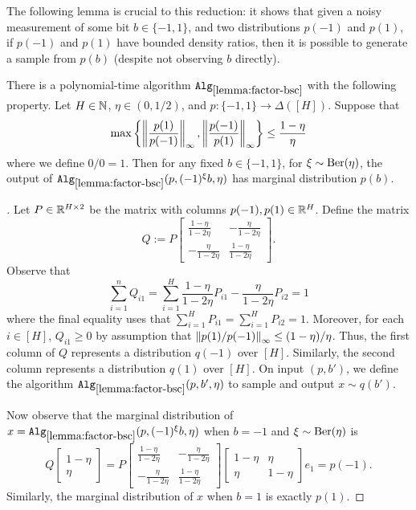 The following lemma is crucial to this reduction: it shows that given a noisy measurement of some bit $b \in \{-1,1\}$, and two distributions $p(-1)$ and $p(1)$, if $p(-1)$ and $p(1)$ have bounded density ratios, then it is possible to generate a sample from $p(b)$ (despite not observing $b$ directly).

\begin{lemma}\label{lemma:factor-bsc}
There is a polynomial-time algorithm $\texttt{Alg}_{\ref{lemma:factor-bsc}}$ with the following property. Let $H \in \mathbb{N}$, $\eta \in (0,1/2)$, and $p: \{-1,1\} \to \Delta([H])$. Suppose that \[\max\left\{\left \lVert \frac{p(1)}{p(-1)} \right \rVert_\infty, \left \lVert \frac{p(-1)}{p(1)} \right \rVert_\infty\right\} \leq \frac{1-\eta}{\eta}\]
where we define $0/0 = 1$. Then for any fixed $b \in \{-1,1\}$, for $\xi \sim \mathrm{Ber}(\eta)$, the output of $\texttt{Alg}_{\ref{lemma:factor-bsc}}(p,(-1)^\xi b,\eta)$ has marginal distribution $p(b)$. %
\end{lemma}

\begin{proof}[]
Let $P \in \mathbb{R}^{H \times 2}$ be the matrix with columns $p(-1), p(1) \in \mathbb{R}^H$. Define the matrix
\[Q := P \begin{bmatrix} \frac{1-\eta}{1-2\eta} & -\frac{\eta}{1-2\eta} \\ -\frac{\eta}{1-2\eta} & \frac{1-\eta}{1-2\eta} \end{bmatrix}.\]
Observe that \[\sum_{i=1}^n Q_{i1} = \sum_{i=1}^H \frac{1-\eta}{1-2\eta} P_{i1} - \frac{\eta}{1-2\eta} P_{i2} = 1\] where the final equality uses that $\sum_{i=1}^H P_{i1} = \sum_{i=1}^H P_{i2} = 1$. Moreover, for each $i \in [H]$,
$Q_{i1} \geq 0$ by assumption that $\left \lVert p(1)/p(-1) \right \rVert_\infty \leq (1-\eta)/\eta$. Thus, the first column of $Q$ represents a distribution $q(-1)$ over $[H]$. Similarly, the second column represents a distribution $q(1)$ over $[H]$. On input $(p,b')$, we define the algorithm $\texttt{Alg}_{\ref{lemma:factor-bsc}}(p,b',\eta)$ to sample and output $x \sim q(b')$.

Now observe that the marginal distribution of $x =\texttt{Alg}_{\ref{lemma:factor-bsc}}(p,(-1)^\xi b,\eta)$ when $b=-1$ and $\xi\sim\mathrm{Ber}(\eta)$ is 
\[Q \begin{bmatrix} 1-\eta \\ \eta \end{bmatrix} = P \begin{bmatrix} \frac{1-\eta}{1-2\eta} & -\frac{\eta}{1-2\eta} \\ -\frac{\eta}{1-2\eta} & \frac{1-\eta}{1-2\eta} \end{bmatrix} \begin{bmatrix} 1-\eta & \eta \\ \eta & 1-\eta \end{bmatrix} e_1 = p(-1).\]
Similarly, the marginal distribution of $x$ when $b=1$ is exactly $p(1)$.
\end{proof}

